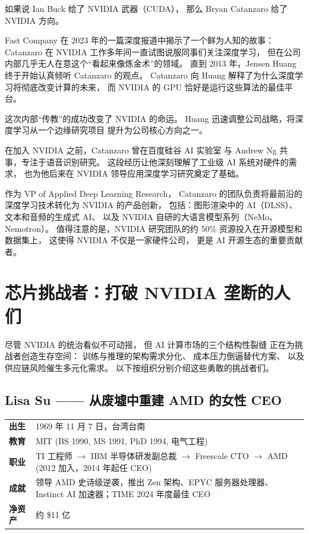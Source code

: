 如果说 Ian Buck 给了 NVIDIA 武器（CUDA），
那么 Bryan Catanzaro 给了 NVIDIA 方向。

Fast Company 在 2023 年的一篇深度报道中揭示了一个鲜为人知的故事：
Catanzaro 在 NVIDIA 工作多年间一直试图说服同事们关注深度学习，
但在公司内部几乎无人在意这个``看起来像炼金术''的领域。
直到 2013 年，Jensen Huang 终于开始认真倾听 Catanzaro 的观点。
Catanzaro 向 Huang 解释了为什么深度学习将彻底改变计算的未来，
而 NVIDIA 的 GPU 恰好是运行这些算法的最佳平台。

这次内部``传教''的成功改变了 NVIDIA 的命运。
Huang 迅速调整公司战略，将深度学习从一个边缘研究项目
提升为公司核心方向之一。

在加入 NVIDIA 之前，Catanzaro 曾在百度硅谷 AI 实验室
与 Andrew Ng 共事，专注于语音识别研究。
这段经历让他深刻理解了工业级 AI 系统对硬件的需求，
也为他后来在 NVIDIA 领导应用深度学习研究奠定了基础。

作为 VP of Applied Deep Learning Research，
Catanzaro 的团队负责将最前沿的深度学习技术转化为 NVIDIA 的产品创新，
包括：图形渲染中的 AI（DLSS）、
文本和音频的生成式 AI、
以及 NVIDIA 自研的大语言模型系列（NeMo、Nemotron）。
值得注意的是，NVIDIA 研究团队的约 50\% 资源投入在开源模型和数据集上，
这使得 NVIDIA 不仅是一家硬件公司，
更是 AI 开源生态的重要贡献者。

\section{芯片挑战者：打破 NVIDIA 垄断的人们}
\label{sec:chip-challengers}

尽管 NVIDIA 的统治看似不可动摇，
但 AI 计算市场的三个结构性裂缝
正在为挑战者创造生存空间：
训练与推理的架构需求分化、
成本压力倒逼替代方案、
以及供应链风险催生多元化需求。
以下按组织分别介绍这些勇敢的挑战者们。

\subsection{Lisa Su —— 从废墟中重建 AMD 的女性 CEO}
\label{subsec:lisa-su}

\begin{keybox}
\small
\begin{tabularx}{\textwidth}{lX}
\toprule
\textbf{出生} & 1969 年 11 月 7 日，台湾台南 \\
\textbf{教育} & MIT (BS 1990, MS 1991, PhD 1994, 电气工程) \\
\textbf{职业} & TI 工程师 $\to$ IBM 半导体研发副总裁 $\to$
                Freescale CTO $\to$ AMD (2012 加入，2014 年起任 CEO) \\
\textbf{成就} & 领导 AMD 史诗级逆袭，推出 Zen 架构、EPYC 服务器处理器、
                Instinct AI 加速器；TIME 2024 年度最佳 CEO \\
\textbf{净资产} & 约 \$11 亿 \\
\bottomrule
\end{tabularx}
\end{keybox}

